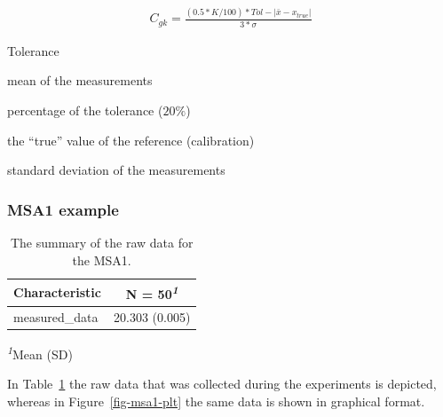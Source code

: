 \documentclass[
  a4paper,
]{scrbook}
\providecommand{\tightlist}{%
  \setlength{\itemsep}{0pt}\setlength{\parskip}{0pt}}\usepackage{longtable,booktabs,array}
\let\olddescription\description
\let\endolddescription\enddescription
\renewenvironment{description}{
          \begin{spacing}{1.5}\olddescription
        }{
          \endolddescription\end{spacing}
        }
\begin{document}
\begin{align}
C_{gk} = \frac{(0.5*K/100)*Tol - |\bar{x}-x_{true}|}{3*\sigma} \label{Cgk}
\end{align}

\begin{description}
\tightlist
\item[\(Tol\)]
Tolerance
\item[\(\bar{x}\)]
mean of the measurements
\item[K]
percentage of the tolerance (\(20\%\))
\item[\(x_{true}\)]
the ``true'' value of the reference (calibration)
\item[\(\sigma\)]
standard deviation of the measurements
\end{description}

\subsubsection{MSA1 example}\label{msa1-example}

\begingroup
\fontsize{12.0pt}{14.4pt}\selectfont
\setlength{\LTpost}{0mm}

\begin{longtable}{lc}

\caption{\label{tbl-msa1-summary}The summary of the raw data for the
MSA1.}

\tabularnewline

\toprule
\textbf{Characteristic} & \textbf{N = 50}\textsuperscript{\textit{1}} \\ 
\midrule\addlinespace[2.5pt]
measured\_data & 20.303 (0.005) \\ 
\bottomrule

\end{longtable}

\begin{minipage}{\linewidth}
\textsuperscript{\textit{1}}Mean (SD)\\
\end{minipage}
\endgroup

In Table~\ref{tbl-msa1-summary} the raw data that was collected during
the experiments is depicted, whereas in Figure~\ref{fig-msa1-plt} the
same data is shown in graphical format.
\end{document}
